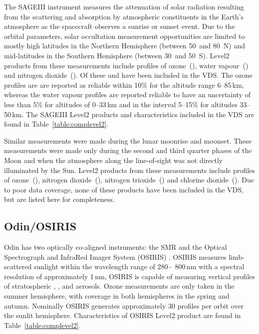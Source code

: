 The SAGEIII instrument measures the attenuation of solar radiation resulting
from the scattering and absorption by atmospheric constituents in the Earth's
atmosphere as the spacecraft observes a sunrise or sunset event.  Due to the
orbital parameters, solar occultation measurement opportunities are limited to
mostly high latitudes in the Northern Hemisphere (between 50\degree~and
80\degree~N) and mid-latitudes in the Southern Hemisphere (between
30\degree~and 50\degree~S).  Level2 products from these measurements include
profiles of ozone~(), water vapour~() and nitrogen
dioxide~().  Of these  and  have been included
in the VDS.  The ozone profiles are are reported as reliable within 10\% for
the altitude range 6--85\,km, whereas the water vapour profiles are reported
reliable to have an uncertainty of less than 5\% for altitudes of 0--33\,km and
in the interval 5--15\% for altitudes 33--50\,km. The SAGEIII Level2
products and characteristics included in the VDS are found in
Table~\ref{table:complevel2}.

Similar measurements were made during the lunar moonrise and moonset.  These
measurements were made only during the second and third quarter phases of
the Moon and when the atmosphere along the line-of-sight was not directly
illuminated by the Sun.  Level2 products from these measurements include
profiles of ozone~(), nitrogen dioxide~(), nitrogen
trioxide~() and chlorine dioxide~().  Due to poor data
coverage, none of these products have been included in the VDS, but are
listed here for completeness.

\subsection{Odin/OSIRIS}

Odin has two optically co-aligned instruments: the SMR 
and the Optical Spectrograph and InfraRed Imager System (OSIRIS)
\citep{llewellyn:osiris:04}. OSIRIS
measures limb-scattered sunlight within the wavelength range of 280\,-\,
800\,nm with a spectral resolution of approximately 1\,nm,
OSIRIS is capable of measuring vertical profiles of stratospheric 
, , and aerosols. 
Ozone measurements are only taken in the
summer hemisphere, with coverage in both hemispheres in
the spring and autumn.
Nominally OSIRIS generates approximately 30
 profiles per orbit over the sunlit hemisphere.
Characteristics of OSIRIS Level2  product
are found in Table~\ref{table:complevel2}.



